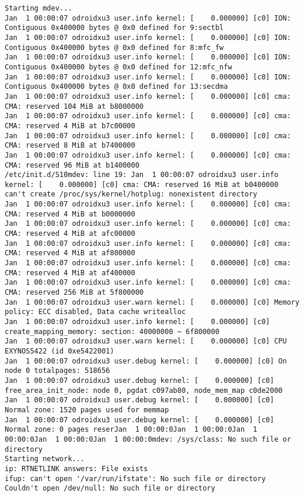 \begin{lstlisting}
Starting mdev...
Jan  1 00:00:07 odroidxu3 user.info kernel: [    0.000000] [c0] ION: Contiguous 0x400000 bytes @ 0x0 defined for 9:sectbl
Jan  1 00:00:07 odroidxu3 user.info kernel: [    0.000000] [c0] ION: Contiguous 0x400000 bytes @ 0x0 defined for 8:mfc_fw
Jan  1 00:00:07 odroidxu3 user.info kernel: [    0.000000] [c0] ION: Contiguous 0x400000 bytes @ 0x0 defined for 12:mfc_nfw
Jan  1 00:00:07 odroidxu3 user.info kernel: [    0.000000] [c0] ION: Contiguous 0x400000 bytes @ 0x0 defined for 13:secdma
Jan  1 00:00:07 odroidxu3 user.info kernel: [    0.000000] [c0] cma: CMA: reserved 104 MiB at b8000000
Jan  1 00:00:07 odroidxu3 user.info kernel: [    0.000000] [c0] cma: CMA: reserved 4 MiB at b7c00000
Jan  1 00:00:07 odroidxu3 user.info kernel: [    0.000000] [c0] cma: CMA: reserved 8 MiB at b7400000
Jan  1 00:00:07 odroidxu3 user.info kernel: [    0.000000] [c0] cma: CMA: reserved 96 MiB at b1400000
/etc/init.d/S10mdev: line 19: Jan  1 00:00:07 odroidxu3 user.info kernel: [    0.000000] [c0] cma: CMA: reserved 16 MiB at b0400000
can't create /proc/sys/kernel/hotplug: nonexistent directory
Jan  1 00:00:07 odroidxu3 user.info kernel: [    0.000000] [c0] cma: CMA: reserved 4 MiB at b0000000
Jan  1 00:00:07 odroidxu3 user.info kernel: [    0.000000] [c0] cma: CMA: reserved 4 MiB at afc00000
Jan  1 00:00:07 odroidxu3 user.info kernel: [    0.000000] [c0] cma: CMA: reserved 4 MiB at af800000
Jan  1 00:00:07 odroidxu3 user.info kernel: [    0.000000] [c0] cma: CMA: reserved 4 MiB at af400000
Jan  1 00:00:07 odroidxu3 user.info kernel: [    0.000000] [c0] cma: CMA: reserved 256 MiB at 5f800000
Jan  1 00:00:07 odroidxu3 user.warn kernel: [    0.000000] [c0] Memory policy: ECC disabled, Data cache writealloc
Jan  1 00:00:07 odroidxu3 user.info kernel: [    0.000000] [c0] create_mapping_memory: section: 40000000 ~ 6f800000
Jan  1 00:00:07 odroidxu3 user.warn kernel: [    0.000000] [c0] CPU EXYNOS5422 (id 0xe5422001)
Jan  1 00:00:07 odroidxu3 user.debug kernel: [    0.000000] [c0] On node 0 totalpages: 518656
Jan  1 00:00:07 odroidxu3 user.debug kernel: [    0.000000] [c0] free_area_init_node: node 0, pgdat c097ab80, node_mem_map c0de2000
Jan  1 00:00:07 odroidxu3 user.debug kernel: [    0.000000] [c0]   Normal zone: 1520 pages used for memmap
Jan  1 00:00:07 odroidxu3 user.debug kernel: [    0.000000] [c0]   Normal zone: 0 pages reserJan  1 00:00:0Jan  1 00:00:0Jan  1 00:00:0Jan  1 00:00:0Jan  1 00:00:0mdev: /sys/class: No such file or directory
Starting network...
ip: RTNETLINK answers: File exists
ifup: can't open '/var/run/ifstate': No such file or directory
Couldn't open /dev/null: No such file or directory

\end{lstlisting}
